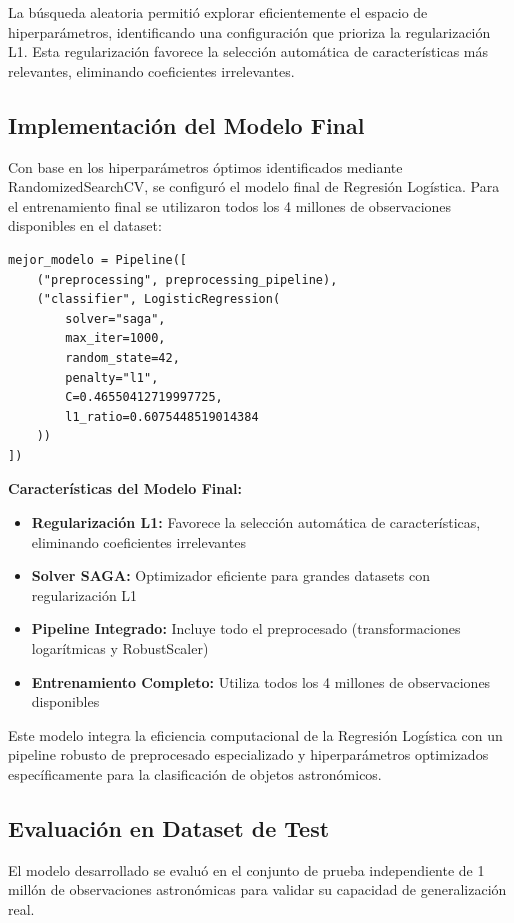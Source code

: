 \documentclass{article}
\begin{document}
La búsqueda aleatoria permitió explorar eficientemente el espacio de hiperparámetros, identificando una configuración que prioriza la regularización L1. Esta regularización favorece la selección automática de características más relevantes, eliminando coeficientes irrelevantes.

\subsection{Implementación del Modelo Final}

Con base en los hiperparámetros óptimos identificados mediante RandomizedSearchCV, se configuró el modelo final de Regresión Logística. Para el entrenamiento final se utilizaron todos los 4 millones de observaciones disponibles en el dataset:

\begin{verbatim}
mejor_modelo = Pipeline([
    ("preprocessing", preprocessing_pipeline),
    ("classifier", LogisticRegression(
        solver="saga",
        max_iter=1000,
        random_state=42,
        penalty="l1",
        C=0.46550412719997725,
        l1_ratio=0.6075448519014384
    ))
])
\end{verbatim}

\textbf{Características del Modelo Final:}
\begin{itemize}
    \item \textbf{Regularización L1:} Favorece la selección automática de características, eliminando coeficientes irrelevantes
    \item \textbf{Solver SAGA:} Optimizador eficiente para grandes datasets con regularización L1
    \item \textbf{Pipeline Integrado:} Incluye todo el preprocesado (transformaciones logarítmicas y RobustScaler)
    \item \textbf{Entrenamiento Completo:} Utiliza todos los 4 millones de observaciones disponibles
\end{itemize}

Este modelo integra la eficiencia computacional de la Regresión Logística con un pipeline robusto de preprocesado especializado y hiperparámetros optimizados específicamente para la clasificación de objetos astronómicos.

\subsection{Evaluación en Dataset de Test}

El modelo desarrollado se evaluó en el conjunto de prueba independiente de 1 millón de observaciones astronómicas para validar su capacidad de generalización real.
\end{document}
